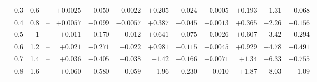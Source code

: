 \documentclass[11pt,a4paper]{article}
\begin{document}
\begin{table}[htbp]
\begin{tabular}{rrrrrrrrrrrrr}
 & 0.3 & 0.6 & -- & $+0.0025$ & $-0.050$ & $-0.0022$ & $+0.205$ & $-0.024$ & $-0.0005$ & $+0.193$ & $-1.31$ & $-0.068$ \\
 & 0.4 & 0.8 & -- & $+0.0057$ & $-0.099$ & $-0.0057$ & $+0.387$ & $-0.045$ & $-0.0013$ & $+0.365$ & $-2.26$ & $-0.156$ \\
 & 0.5 & 1 & -- & $+0.011$ & $-0.170$ & $-0.012$ & $+0.641$ & $-0.075$ & $-0.0026$ & $+0.607$ & $-3.42$ & $-0.294$ \\
 & 0.6 & 1.2 & -- & $+0.021$ & $-0.271$ & $-0.022$ & $+0.981$ & $-0.115$ & $-0.0045$ & $+0.929$ & $-4.78$ & $-0.491$ \\
 & 0.7 & 1.4 & -- & $+0.036$ & $-0.405$ & $-0.038$ & $+1.42$ & $-0.166$ & $-0.0071$ & $+1.34$ & $-6.33$ & $-0.755$ \\
 & 0.8 & 1.6 & -- & $+0.060$ & $-0.580$ & $-0.059$ & $+1.96$ & $-0.230$ & $-0.010$ & $+1.87$ & $-8.03$ & $-1.09$ \\
\bottomrule
\end{tabular}
\end{table}
\end{document}
